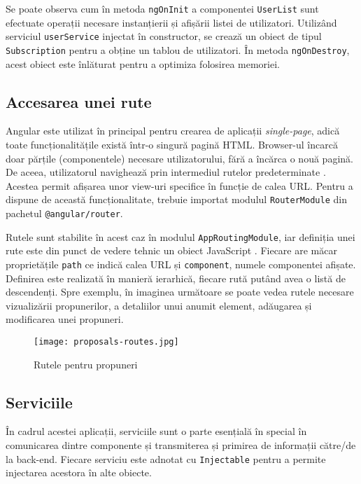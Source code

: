 Se poate observa cum în metoda \texttt{ngOnInit} a componentei \texttt{UserList} sunt efectuate operații necesare instanțierii și afișării listei de utilizatori. Utilizând serviciul \texttt{userService} injectat în constructor, se crează un obiect de tipul \texttt{Subscription} pentru a obține un tablou de utilizatori. În metoda \texttt{ngOnDestroy}, acest obiect este înlăturat pentru a optimiza folosirea memoriei.

\subsection{Accesarea unei rute}

Angular este utilizat în principal pentru crearea de aplicații \textit{single-page}, adică toate funcționalitățile există într-o singură pagină HTML. Browser-ul încarcă doar părțile (componentele) necesare utilizatorului, fără a încărca o nouă pagină. De aceea, utilizatorul navighează prin intermediul rutelor predeterminate \cite{angular-routes}. Acestea permit afișarea unor view-uri specifice în funcție de calea URL. Pentru a dispune de această funcționalitate, trebuie importat modulul \texttt{RouterModule} din pachetul \texttt{@angular/router}.

Rutele sunt stabilite în acest caz în modulul \texttt{AppRoutingModule}, iar definiția unei rute este din punct de vedere tehnic un obiect JavaScript \cite{angular-routes}. Fiecare are măcar proprietățile \texttt{path} ce indică calea URL și \texttt{component}, numele componentei afișate. Definirea este realizată în manieră ierarhică, fiecare rută putând avea o listă de descendenți. Spre exemplu, în imaginea următoare se poate vedea rutele necesare vizualizării propunerilor, a detaliilor unui anumit element, adăugarea și modificarea unei propuneri.

\begin{figure}[H]
	\centering
	\texttt{[image: proposals-routes.jpg]}
	\caption{Rutele pentru propuneri}
\end{figure}

\subsection{Serviciile}

În cadrul acestei aplicații, serviciile sunt o parte esențială în special în comunicarea dintre componente și transmiterea și primirea de informații către/de la back-end. Fiecare serviciu este adnotat cu \texttt{Injectable} pentru a permite injectarea acestora în alte obiecte.

